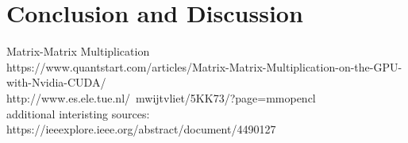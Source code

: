 \documentclass[a4paper,12pt]{llncs}
\numberwithin{equation}{section}
\begin{document}

\section{Conclusion and Discussion}




Matrix-Matrix Multiplication\\
https://www.quantstart.com/articles/Matrix-Matrix-Multiplication-on-the-GPU-with-Nvidia-CUDA/\\
http://www.es.ele.tue.nl/~mwijtvliet/5KK73/?page=mmopencl\\

additional interisting sources:\\
  https://ieeexplore.ieee.org/abstract/document/4490127




\newpage



\end{document}
